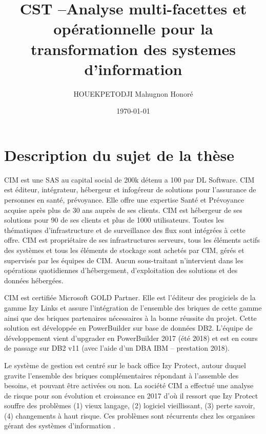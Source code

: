 \documentclass[a4paper]{article}
\title{CST --Analyse multi-facettes et opérationnelle pour la transformation des systemes d’information}
\author{ HOUEKPETODJI Mahugnon Honoré}
\begin{document}
\institution{}

\date{\today}

\maketitle


\section{Description du sujet de la thèse}
CIM est une SAS au capital social de 200k détenu a 100 par DL Software. 
CIM est éditeur, intégrateur, hébergeur et infogéreur de solutions pour l'assurance de personnes en santé, prévoyance. 
Elle offre une expertise Santé et Prévoyance acquise après
plus de 30 ans auprès de ses clients. 
CIM est hébergeur de ses solutions pour 90 de ses clients et plus de 1000 utilisateurs. 
Toutes les thématiques d'infrastructure et de surveillance des flux sont intégrées à cette offre.
CIM est propriétaire de ses infrastructures serveurs, tous les éléments actifs des systèmes et tous les éléments de stockage sont achetés par CIM, gérés et supervisés par les équipes de CIM. Aucun sous-traitant n'intervient dans les opérations quotidiennes d'hébergement, d'exploitation des solutions et des données hébergées.

CIM est certifiée Microsoft GOLD Partner. 
Elle est l'éditeur des progiciels de la gamme Izy Links et assure l'intégration de l'ensemble des briques de cette gamme ainsi que des briques partenaires nécessaires à la bonne réussite du projet. Cette solution est développée en PowerBuilder sur base de données DB2. L'équipe de développement
vient d'upgrader en PowerBuilder 2017 (été 2018) et est en cours de passage sur DB2 v11 (avec l'aide d'un DBA IBM – prestation 2018).

Le système de gestion est centré sur le back office Izy Protect, autour duquel gravite l'ensemble des briques complémentaires répondant à l'assemble des besoins, et pouvant
être activées ou non. 
La société CIM a effectué une analyse de risque pour son évolution et croissance en 2017 d'où il ressort que Izy Protect souffre des problèmes 
(1) vieux langage,
(2) logiciel vieillissant,
(3) perte savoir,
(4) changements à haut risque.
Ces problèmes sont récurrents chez les organises gérant des systèmes d'information \cite{Deme02a}.
\end{document}
